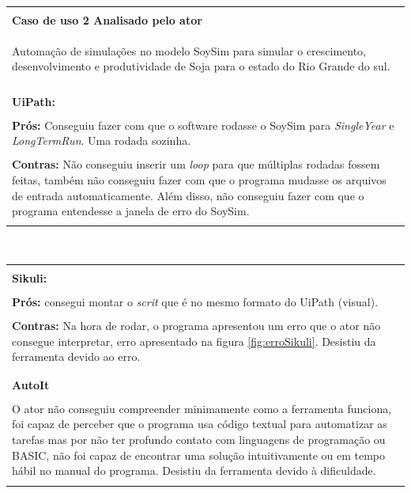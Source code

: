 \documentclass[tg]{mdtufsm}
\begin{document}
            	{\centering
                    \begin{tabular}{ | m{15.6cm} | }
                		\hline \\
                		{\bf Caso de uso 2 Analisado pelo ator} \\
                		\begin{center}
                            Automação de simulações no modelo SoySim para simular o crescimento, desenvolvimento e produtividade de Soja para o estado do Rio Grande do sul.
                        \end{center}
                		\\ \hline \hline \\
            	        {\bf UiPath:} \\ \\
                		{\bf Prós:}
                            Conseguiu fazer com que o software rodasse o SoySim para \emph{SingleYear} e  \emph{LongTermRun}. Uma rodada sozinha. \\ \\
                		{\bf Contras:}
                            Não conseguiu inserir um \emph{loop} para que múltiplas rodadas fossem feitas, também não conseguiu fazer com que o programa mudasse os arquivos de entrada automaticamente. Além disso, não conseguiu fazer com que o programa entendesse a janela de erro do SoySim. \\ \\
            		    \hline
                    \end{tabular} \\

                    \begin{tabular}{ | m{15.6cm} | }
                        \hline \\
                		{\bf Sikuli:} \\ \\
                		{\bf Prós:}
                            consegui montar o \emph{scrit} que é no mesmo formato do UiPath (visual).  \\ \\
                		{\bf Contras:}
                            Na hora de rodar, o programa apresentou um erro que o ator não consegue interpretar, erro apresentado na figura \ref{fig:erroSikuli}. Desistiu da ferramenta devido ao erro. \\ \\
                		\hline \hline \\
                		{\bf AutoIt} \\ \\
                            O ator não conseguiu compreender minimamente como a ferramenta funciona, foi capaz de perceber que o programa usa código textual para automatizar as tarefas mas por não ter profundo contato com linguagens de programação ou BASIC, não foi capaz de encontrar uma solução intuitivamente ou em tempo hábil no manual do programa. Desistiu da ferramenta devido à dificuldade. \\ \\
            	       \hline
            	   \end{tabular}
                }
\end{document}
